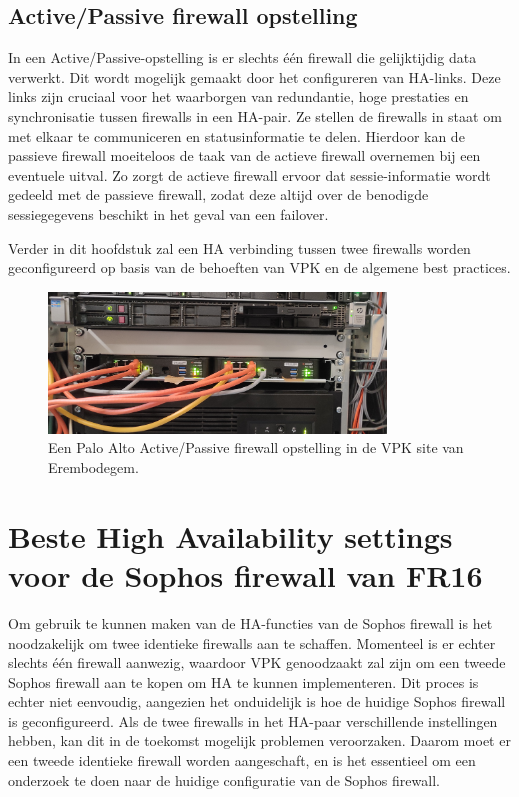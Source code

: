 \subsection{Active/Passive firewall opstelling}

In een Active/Passive-opstelling is er slechts één firewall die gelijktijdig data verwerkt. Dit wordt mogelijk gemaakt door het configureren van HA-links. Deze links zijn cruciaal voor het waarborgen van redundantie, hoge prestaties en synchronisatie tussen firewalls in een HA-pair. Ze stellen de firewalls in staat om met elkaar te communiceren en statusinformatie te delen. Hierdoor kan de passieve firewall moeiteloos de taak van de actieve firewall overnemen bij een eventuele uitval. Zo zorgt de actieve firewall ervoor dat sessie-informatie wordt gedeeld met de passieve firewall, zodat deze altijd over de benodigde sessiegegevens beschikt in het geval van een failover. \autocite{PaloAltoHA2025} \autocite{PaloAltoHAb2025}

Verder in dit hoofdstuk zal een HA verbinding tussen twee firewalls worden geconfigureerd op basis van de behoeften van VPK en de algemene best practices.

\begin{figure}[H]
    \centering
    \includegraphics[width=0.8\textwidth]{fotos/PA_FirewallPairBE02.jpg}
    \caption[Palo Alto Active/Passive pair]{\label{fig:grail}Een Palo Alto Active/Passive firewall opstelling in de VPK site van Erembodegem.}
\end{figure} 



\section{Beste High Availability settings voor de Sophos firewall van FR16}

Om gebruik te kunnen maken van de HA-functies van de Sophos firewall is het noodzakelijk om twee identieke firewalls aan te schaffen. Momenteel is er echter slechts één firewall aanwezig, waardoor VPK genoodzaakt zal zijn om een tweede Sophos firewall aan te kopen om HA te kunnen implementeren. Dit proces is echter niet eenvoudig, aangezien het onduidelijk is hoe de huidige Sophos firewall is geconfigureerd. Als de twee firewalls in het HA-paar verschillende instellingen hebben, kan dit in de toekomst mogelijk problemen veroorzaken. Daarom moet er een tweede identieke firewall worden aangeschaft, en is het essentieel om een onderzoek te doen naar de huidige configuratie van de Sophos firewall.


